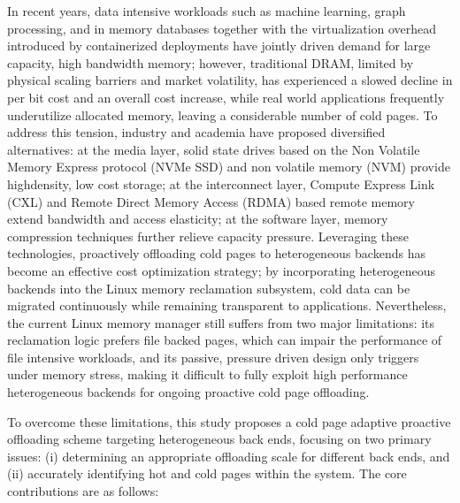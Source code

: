 \begin{englishabstract}

In recent years, data intensive workloads such as machine learning, graph processing, and in memory databases together with the virtualization overhead introduced by  containerized deployments have jointly driven demand for large capacity, high bandwidth memory; however, traditional DRAM, limited by physical scaling barriers and market volatility, has experienced a slowed decline in per bit cost and an overall cost increase, while real world applications frequently underutilize allocated memory, leaving a considerable number of cold pages. To address this tension, industry and academia have proposed diversified alternatives: at the media layer, solid state drives based on the Non Volatile Memory Express protocol (NVMe SSD) and non volatile memory (NVM) provide highdensity, low cost storage; at the interconnect layer, Compute Express Link (CXL) and Remote Direct Memory Access (RDMA) based remote memory extend bandwidth and access elasticity; at the software layer, memory compression techniques further relieve capacity pressure. Leveraging these technologies, proactively offloading cold pages to heterogeneous backends has become an effective cost optimization strategy; by incorporating heterogeneous backends into the Linux memory reclamation subsystem, cold data can be migrated continuously while remaining transparent to applications. Nevertheless, the current Linux memory manager still suffers from two major limitations: its reclamation logic prefers file backed pages, which can impair the performance of file intensive workloads, and its passive, pressure driven design only triggers under memory stress, making it difficult to fully exploit high performance heterogeneous backends for ongoing proactive cold page offloading.

To overcome these limitations, this study proposes a cold page adaptive proactive offloading scheme targeting heterogeneous back ends, focusing on two primary issues: (i) determining an appropriate offloading scale for different back ends, and (ii) accurately identifying hot and cold pages within the system. The core contributions are as follows:


\end{englishabstract}
